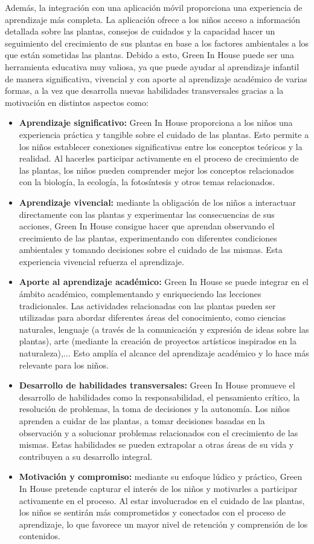 Además, la integración con una aplicación móvil proporciona una experiencia de aprendizaje más completa. La aplicación ofrece a los niños acceso a información detallada sobre las plantas, consejos de cuidados y la capacidad hacer un seguimiento del crecimiento de sus plantas en base a los factores ambientales a los que están sometidas las plantas. Debido a esto, Green In House puede ser una herramienta educativa muy valiosa, ya que puede ayudar al aprendizaje infantil de manera significativa, vivencial y con aporte al aprendizaje académico de varias formas, a la vez que desarrolla nuevas habilidades transversales gracias a la motivación en distintos aspectos como:
\begin{itemize}
    \item \textbf{Aprendizaje significativo:} Green In House proporciona a los niños una experiencia práctica y tangible sobre el cuidado de las plantas. Esto permite a los niños establecer conexiones significativas entre los conceptos teóricos y la realidad. Al hacerles participar activamente en el proceso de crecimiento de las plantas, los niños pueden comprender mejor los conceptos relacionados con la biología, la ecología, la fotosíntesis y otros temas relacionados.
    \item \textbf{Aprendizaje vivencial:} mediante la obligación de los niños a interactuar directamente con las plantas y experimentar las consecuencias de sus acciones, Green In House consigue hacer que aprendan observando el crecimiento de las plantas, experimentando con diferentes condiciones ambientales y tomando decisiones sobre el cuidado de las mismas. Esta experiencia vivencial refuerza el aprendizaje.
    \item \textbf{Aporte al aprendizaje académico:} Green In House se puede integrar en el ámbito académico, complementando y enriqueciendo las lecciones tradicionales. Las actividades relacionadas con las plantas pueden ser utilizadas para abordar diferentes áreas del conocimiento, como ciencias naturales, lenguaje (a través de la comunicación y expresión de ideas sobre las plantas), arte (mediante la creación de proyectos artísticos inspirados en la naturaleza),... Esto amplía el alcance del aprendizaje académico y lo hace más relevante para los niños.
    \item \textbf{Desarrollo de habilidades transversales:} Green In House promueve el desarrollo de habilidades como la responsabilidad, el pensamiento crítico, la resolución de problemas, la toma de decisiones y la autonomía. Los niños aprenden a cuidar de las plantas, a tomar decisiones basadas en la observación y a solucionar problemas relacionados con el crecimiento de las mismas. Estas habilidades se pueden extrapolar a otras áreas de su vida y contribuyen a su desarrollo integral.
    \item \textbf{Motivación y compromiso:} mediante su enfoque lúdico y práctico, Green In House pretende capturar el interés de los niños y motivarles a participar activamente en el proceso. Al estar involucrados en el cuidado de las plantas, los niños se sentirán más comprometidos y conectados con el proceso de aprendizaje, lo que favorece un mayor nivel de retención y comprensión de los contenidos.
\end{itemize}
